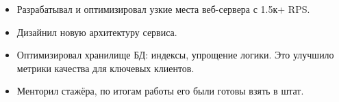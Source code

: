 \begin{itemize}
    \item Разрабатывал и оптимизировал узкие места веб-сервера с 1.5к+ RPS.
    \item Дизайнил новую архитектуру сервиса.
    \item Оптимизировал хранилище БД: индексы, упрощение логики.
    Это улучшило метрики качества для ключевых клиентов.
    \item Менторил стажёра, по итогам работы его были готовы взять в штат.
\end{itemize}

